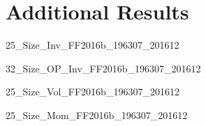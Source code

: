 
\section{Additional Results} \label{sec:addl_results}

{25_Size_Inv_FF2016b_196307_201612}

\begin{landscape}
{32_Size_OP_Inv_FF2016b_196307_201612}
\end{landscape}

{25_Size_Vol_FF2016b_196307_201612}

{25_Size_Mom_FF2016b_196307_201612}
